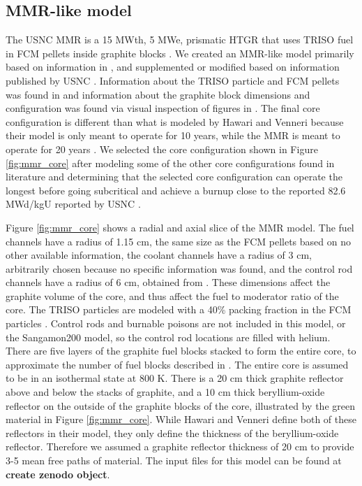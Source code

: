 \subsection{MMR-like model}
The \gls{USNC} \gls{MMR} is a 15 MWth, 5 MWe, prismatic \gls{HTGR} that 
uses \gls{TRISO} fuel in \acrfull{FCM} pellets inside graphite blocks 
\cite{noauthor_usnc_2021}.
We created an \gls{MMR}-like model primarily based on information in 
\cite{hawari_development_2018}, and supplemented or modified based on 
information published by \gls{USNC} \cite{noauthor_usnc_2021}. 
Information about the \gls{TRISO} 
particle and \gls{FCM} pellets was found in \cite{noauthor_usnc_2021}
and information about the graphite block dimensions and configuration 
was found via visual inspection of figures in \cite{venneri_micro_2019}. 
The final core configuration 
is different than what is modeled by Hawari and Venneri \cite{hawari_development_2018} 
because their model is only meant to operate 
for 10 years, while the \gls{MMR} is meant to operate for 20 years 
\cite{noauthor_usnc_2021}. We selected the core configuration shown in 
Figure \ref{fig:mmr_core} after modeling some of the other core 
configurations found in literature \cite{mitchell_usnc_2020,hawari_development_2018}
and determining that the selected core configuration  
can operate the longest before going subcritical and 
achieve a burnup close to the reported 82.6 MWd/kgU reported by 
\gls{USNC} \cite{noauthor_usnc_2021}. 

Figure \ref{fig:mmr_core} shows a radial and axial slice of the 
\gls{MMR} model. The fuel channels have a radius of 1.15 cm, the same
size as the \gls{FCM} pellets based on no other available information, 
the coolant channels have a radius of 
3 cm, arbitrarily chosen because no specific information was found, 
and the control rod channels have a radius of 6 cm, obtained from 
\cite{hawari_development_2018}. These dimensions affect the graphite volume 
of the core, and thus affect the fuel to moderator ratio of the core. 
The \gls{TRISO} particles are modeled with a 40\% packing fraction in 
the \gls{FCM} particles \cite{powers_fully_2014}.
Control rods and burnable poisons are not included in this model, or 
the Sangamon200 model, so the control rod locations are filled with helium.
There are five layers of the graphite fuel blocks 
stacked to form the entire core, to approximate the number of 
fuel blocks described in \cite{noauthor_usnc_2021}. The entire core 
is assumed to be in an isothermal state at 800 K. There is a 20 cm 
thick graphite reflector above and below the stacks of graphite, 
and a 10 cm thick beryllium-oxide reflector on the outside of the 
graphite blocks of the core, illustrated by the green material in 
Figure \ref{fig:mmr_core}. While Hawari and Venneri \cite{hawari_development_2018}
define both of these reflectors in their model, they only 
define the thickness of the beryllium-oxide reflector. Therefore we 
assumed a graphite reflector thickness of 20 cm to provide 3-5 mean 
free paths of material. 
The input files for this model can be found at \textbf{create zenodo 
object}.

